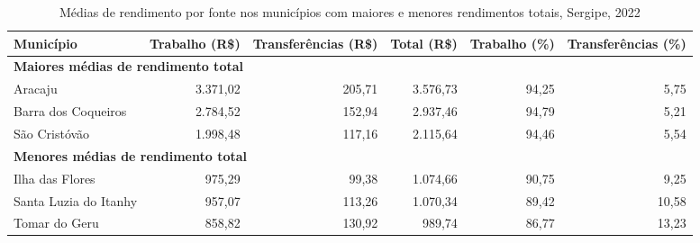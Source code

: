\begin{table}[htbp]
\centering
\caption{Médias de rendimento por fonte nos municípios com maiores e menores rendimentos totais, Sergipe, 2022}
\label{tab:item4-renda-fontes}
\scriptsize
\begin{tabular}{lrrrrr}
\toprule
Município & Trabalho (R\$) & Transferências (R\$) & Total (R\$) & Trabalho (\%) & Transferências (\%) \\
\midrule
\multicolumn{6}{l}{\textbf{Maiores médias de rendimento total}} \\
Aracaju & 3.371,02 & 205,71 & 3.576,73 & 94,25 & 5,75 \\
Barra dos Coqueiros & 2.784,52 & 152,94 & 2.937,46 & 94,79 & 5,21 \\
São Cristóvão & 1.998,48 & 117,16 & 2.115,64 & 94,46 & 5,54 \\
\midrule
\multicolumn{6}{l}{\textbf{Menores médias de rendimento total}} \\
Ilha das Flores & 975,29 & 99,38 & 1.074,66 & 90,75 & 9,25 \\
Santa Luzia do Itanhy & 957,07 & 113,26 & 1.070,34 & 89,42 & 10,58 \\
Tomar do Geru & 858,82 & 130,92 & 989,74 & 86,77 & 13,23 \\
\bottomrule
\end{tabular}
\end{table}
